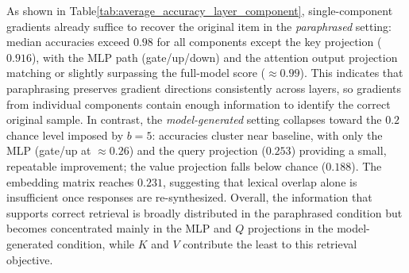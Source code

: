 As shown in Table\ref{tab:average_accuracy_layer_component}, single-component gradients already suffice to recover the original item in the \emph{paraphrased} setting: median accuracies exceed $0.98$ for all components except the key projection ($0.916$), with the MLP path (gate/up/down) and the attention output projection matching or slightly surpassing the full-model score ($\approx 0.99$). This indicates that paraphrasing preserves gradient directions consistently across layers, so gradients from individual components contain enough information to identify the correct original sample. In contrast, the \emph{model-generated} setting collapses toward the $0.2$ chance level imposed by $b{=}5$: accuracies cluster near baseline, with only the MLP (gate/up at $\approx 0.26$) and the query projection ($0.253$) providing a small, repeatable improvement; the value projection falls below chance ($0.188$). The embedding matrix reaches $0.231$, suggesting that lexical overlap alone is insufficient once responses are re-synthesized. Overall, the information that supports correct retrieval is broadly distributed in the paraphrased condition but becomes concentrated mainly in the MLP and $Q$ projections in the model-generated condition, while $K$ and $V$ contribute the least to this retrieval objective.

